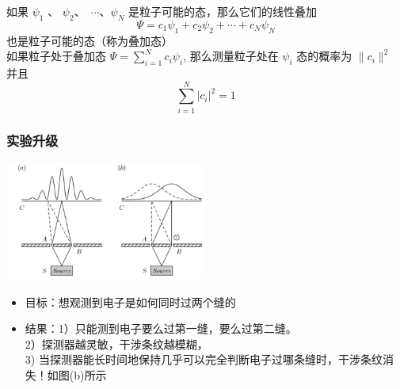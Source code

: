 \begin{frame}
    \frametitle{}
    \begin{tcolorbox}[colback=yellow!10,colframe=red!75!black,title=态叠加原理]
    如果 $\psi_1$ 、 $\psi_2$、 $\cdots$、$\psi_N$ 是粒子可能的态，那么它们的线性叠加
        $$ \Psi=c_1 \psi_1+ c_2\psi_2+\cdots+c_N\psi_N $$
    也是粒子可能的态（称为叠加态）\\   
    如果粒子处于叠加态 $\Psi=\sum\limits_{i=1}^N c_i \psi_i$,  
    那么测量粒子处在 $\psi_i$ 态的概率为 $\|c_i\|^2$\\ 
    并且  $$\sum_{i=1}^{N} |c_i|^2 =1$$
    \end{tcolorbox}
\end{frame}

\begin{frame}
    \frametitle{实验升级}
    \begin{center}
        \includegraphics[width=0.5\textwidth]{figs/sup-4.png} \\
    \end{center} 
    \begin{itemize}
        \item 目标：想观测到电子是如何同时过两个缝的
        \item 结果：1）只能测到电子要么过第一缝，要么过第二缝。\\
        2）探测器越灵敏，干涉条纹越模糊，\\
        3) 当探测器能长时间地保持几乎可以完全判断电子过哪条缝时，干涉条纹消失！如图(b)所示
    \end{itemize}
\end{frame}

